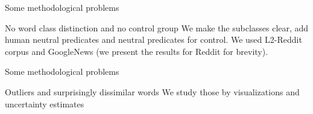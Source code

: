 \documentclass[
  10pt,
  ignorenonframetext,
  x11names, dvipsnames, bibspacing,natbib]{beamer}
\begin{document}
\begin{frame}{Some methodological problems}
\protect\hypertarget{some-methodological-problems-1}{}
\begin{block}{No word class distinction and no control group}
\protect\hypertarget{no-word-class-distinction-and-no-control-group}{}
We make the subclasses clear, add human neutral predicates and neutral
predicates for control. We used L2-Reddit corpus and GoogleNews (we
present the results for Reddit for brevity).

\footnotesize 
\begin{table}

\caption{\label{tab:religionTableHeadLate}Rows from extended religion dataset.}
\centering
{}
\end{table}
\normalsize
\end{block}
\end{frame}

\begin{frame}{Some methodological problems}
\protect\hypertarget{some-methodological-problems-2}{}
\begin{block}{Outliers and surprisingly dissimilar words}
\protect\hypertarget{outliers-and-surprisingly-dissimilar-words}{}
We study those by visualizations and uncertainty estimates
\end{block}
\end{frame}
\end{document}
